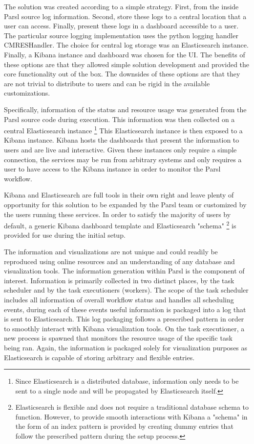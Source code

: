 The solution was created according to a simple strategy.
First, from the inside Parsl source log information.
Second, store these logs to a central location that a user can access.
Finally, present these logs in a dashboard accessible to a user.
The particular source logging implementation uses the python logging handler CMRESHandler.
The choice for central log storage was an Elasticsearch instance.
Finally, a Kibana instance and dashboard was chosen for the UI.
The benefits of these options are that they allowed simple solution development and provided the core functionality out of the box.
The downsides of these options are that they are not trivial to distribute to users and can be rigid in the available customizations.

Specifically, information of the status and resource usage was generated from the Parsl source code during execution.
This information was then collected on a central Elasticsearch instance \footnote{Since Elasticsearch is a distributed database, information only needs to be sent to a single node and will be propagated by Elasticsearch itself.}
This Elasticsearch instance is then exposed to a Kibana instance.
Kibana hosts the dashboards that present the information to users and are live and interactive.
Given these instances only require a simple connection, the services may be run from arbitrary systems and only requires a user to have access to the Kibana instance in order to monitor the Parsl workflow.

Kibana and Elasticsearch are full tools in their own right and leave plenty of opportunity for this solution to be expanded by the Parsl team or customized by the users running these services.
In order to satisfy the majority of users by default, a generic Kibana dashboard template and Elasticsearch "schema" \footnote{Elasticsearch is flexible and does not require a traditional database schema to function. However, to provide smooth interactions with Kibana a "schema" in the form of an index pattern is provided by creating dummy entries that follow the prescribed pattern during the setup process.} is provided for use during the initial setup.

The information and visualizations are not unique and could readily be reproduced using online resources and an understanding of any database and visualization tools.
The information generation within Parsl is the component of interest.
Information is primarily collected in two distinct places, by the task scheduler and by the task executioners (workers).
The scope of the task scheduler includes all information of overall workflow status and handles all scheduling events, during each of these events useful information is packaged into a log that is sent to Elasticsearch.
This log packaging follows a prescribed pattern in order to smoothly interact with Kibana visualization tools.
On the task executioner, a new process is spawned that monitors the resource usage of the specific task being ran.
Again, the information is packaged solely for visualization purposes as Elasticsearch is capable of storing arbitrary and flexible entries.

